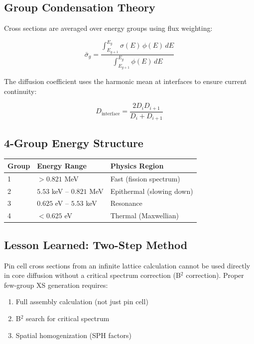 \documentclass[12pt,a4paper]{article}
\begin{document}
\subsection{Group Condensation Theory}

Cross sections are averaged over energy groups using flux weighting:

\begin{equation}
    \bar{\sigma}_g = \frac{\displaystyle\int_{E_{g+1}}^{E_g}
    \sigma(E)\,\phi(E)\,dE}
    {\displaystyle\int_{E_{g+1}}^{E_g} \phi(E)\,dE}
\end{equation}

The diffusion coefficient uses the harmonic mean at interfaces to ensure
current continuity:

\begin{equation}
    D_{\text{interface}} = \frac{2 D_i D_{i+1}}{D_i + D_{i+1}}
\end{equation}

\subsection{4-Group Energy Structure}

\begin{center}
\begin{tabular}{lll}
\toprule
\textbf{Group} & \textbf{Energy Range} & \textbf{Physics Region} \\
\midrule
1 & $> 0.821$ MeV & Fast (fission spectrum) \\
2 & $5.53$ keV -- $0.821$ MeV & Epithermal (slowing down) \\
3 & $0.625$ eV -- $5.53$ keV & Resonance \\
4 & $< 0.625$ eV & Thermal (Maxwellian) \\
\bottomrule
\end{tabular}
\end{center}

\subsection{Lesson Learned: Two-Step Method}

Pin cell cross sections from an infinite lattice calculation cannot be used
directly in core diffusion without a critical spectrum correction (B$^2$
correction). Proper few-group XS generation requires:

\begin{enumerate}
    \item Full assembly calculation (not just pin cell)
    \item B$^2$ search for critical spectrum
    \item Spatial homogenization (SPH factors)
\end{enumerate}
\end{document}
